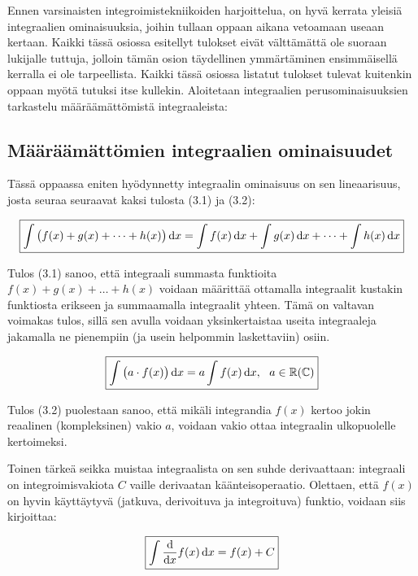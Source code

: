 \documentclass[../integrointiopas.tex]{subfiles}
\begin{document}
	Ennen varsinaisten integroimistekniikoiden harjoittelua, on hyvä kerrata yleisiä integraalien ominaisuuksia, joihin tullaan oppaan aikana vetoamaan useaan kertaan. Kaikki tässä osiossa esitellyt tulokset eivät välttämättä ole suoraan lukijalle tuttuja, jolloin tämän osion täydellinen ymmärtäminen ensimmäisellä kerralla ei ole tarpeellista. Kaikki tässä osiossa listatut tulokset tulevat kuitenkin oppaan myötä tutuksi itse kullekin. Aloitetaan integraalien perusominaisuuksien tarkastelu määräämättömistä integraaleista:
	
	\subsection{Määräämättömien integraalien ominaisuudet}
	
	Tässä oppaassa eniten hyödynnetty integraalin ominaisuus on sen lineaarisuus, josta seuraa seuraavat kaksi tulosta (3.1) ja (3.2):
	
	\begin{equation}
		\boxed{\int\big(f(x) + g(x) + \dots + h(x)\big)\odif{x} = \int f(x)\odif{x} + \int g(x)\odif{x} + \dots + \int h(x)\odif{x}}
	\end{equation}
	
	Tulos (3.1) sanoo, että integraali summasta funktioita $f(x) + g(x) + \dots + h(x)$ voidaan määrittää ottamalla integraalit kustakin funktiosta erikseen ja summaamalla integraalit yhteen. Tämä on valtavan voimakas tulos, sillä sen avulla voidaan yksinkertaistaa useita integraaleja jakamalla ne pienempiin (ja usein helpommin laskettaviin) osiin.
	
	\begin{equation}
		\boxed{\int \big(a\cdot f(x)\big)\odif{x} = a\int f(x)\odif{x}, \ \ a\in\mathbb{R}(\mathbb{C})}
	\end{equation}
	
	Tulos (3.2) puolestaan sanoo, että mikäli integrandia $f(x)$ kertoo jokin reaalinen (kompleksinen) vakio $a$, voidaan vakio ottaa integraalin ulkopuolelle kertoimeksi.
	
	Toinen tärkeä seikka muistaa integraalista on sen suhde derivaattaan: integraali on integroimisvakiota $C$ vaille derivaatan käänteisoperaatio. Olettaen, että $f(x)$ on hyvin käyttäytyvä (jatkuva, derivoituva ja integroituva) funktio, voidaan siis kirjoittaa:
	
	\begin{equation}
		\boxed{\int \odv{}{x}f(x)\odif{x} = f(x) + C}
	\end{equation}
	
\end{document}
